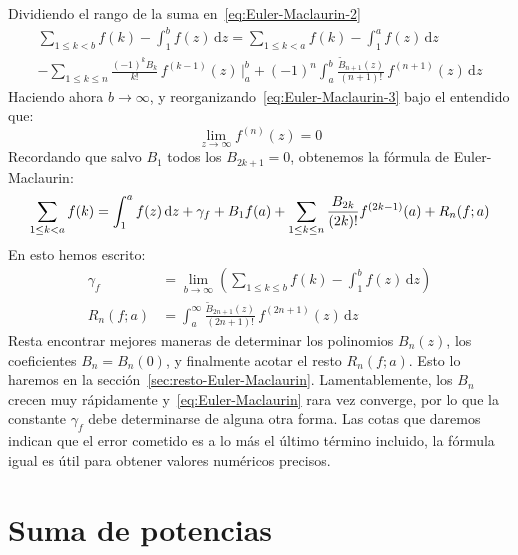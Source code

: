   Dividiendo el rango de la suma en~\eqref{eq:Euler-Maclaurin-2}
  \begin{multline}
    \label{eq:Euler-Maclaurin-3}
    \sum_{1 \le k < b} f(k) - \int_1^b f(z) \, \mathrm{d} z
      = \sum_{1 \le k < a} f(k) - \int_1^a f(z) \, \mathrm{d} z \\
	   - \sum_{1 \le k \le n}
	       \frac{(-1)^k B_k}{k!} \, f^{(k - 1)}(z)
		  \, \biggr|_a^b
	   + (-1)^n \int_a^b \frac{\widetilde{B}_{n + 1}(z)}
				  {(n + 1)!} \,
				     f^{(n + 1)}(z)
		      \, \mathrm{d} z
  \end{multline}
  Haciendo ahora \(b \rightarrow \infty\),
  y reorganizando~\eqref{eq:Euler-Maclaurin-3}
  bajo el entendido que:
  \begin{equation*}
    \lim_{z \rightarrow \infty} f^{(n)} (z) = 0
  \end{equation*}
  Recordando que salvo \(B_1\) todos los \(B_{2 k + 1} = 0\),
  obtenemos la fórmula de Euler-Maclaurin:
  \begin{equation}
    \index{Euler-Maclaurin, formula de@Euler-Maclaurin, fórmula de|textbfhy}
    \label{eq:Euler-Maclaurin}
    \sum_{1 \le k < a} f(k)
      = \int_1^a f(z) \, \mathrm{d} z
	  + \gamma_f
	  + B_1 f(a)
	  + \sum_{1 \le k \le n}
	       \frac{B_{2 k}}{(2 k)!} f^{(2 k - 1)}(a)
	  + R_n(f; a)
  \end{equation}
  En esto hemos escrito:
  \begin{align}
    \gamma_f
      &= \lim_{b \rightarrow \infty}
	   \left(
	     \sum_{1 \le k \le b} f(k) - \int_1^b f(z)
					   \, \mathrm{d} z
	   \right)
	      \label{eq:gamma-f} \\
    R_n(f; a)
      &= \int_a^\infty
	   \frac{\widetilde{B}_{2 n + 1}(z)}{(2 n + 1)!} \,
	     f^{(2 n + 1)}(z) \, \mathrm{d} z
	      \label{eq:euler-maclaurin-residue}
  \end{align}
  Resta encontrar mejores maneras
  de determinar los polinomios \(B_n(z)\),
  los coeficientes \(B_n = B_n(0)\),
  y finalmente acotar el resto \(R_n(f; a)\).
  Esto lo haremos en la sección~\ref{sec:resto-Euler-Maclaurin}.
  Lamentablemente,
  los \(B_n\) crecen muy rápidamente
  y~\eqref{eq:Euler-Maclaurin} rara vez converge,
  por lo que la constante \(\gamma_f\)
  debe determinarse de alguna otra forma.
  Las cotas que daremos indican que el error cometido
  es a lo más el último término incluido,
  la fórmula igual es útil para obtener valores numéricos precisos.

\section{Suma de potencias}
\label{sec:suma-potencias}

